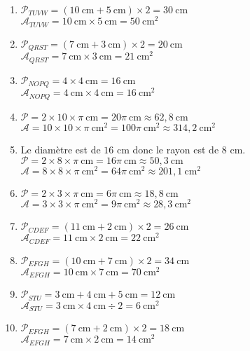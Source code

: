 \documentclass[a4paper,11pt,fleqn]{article}
\begin{document}
\begin{correction}
\begin{multicols}{2}
\begin{enumerate}
	\item $\mathcal{P}_{TUVW}=(10~\text{cm}+5~\text{cm})\times2=30~\text{cm}$\\
$\mathcal{A}_{TUVW}=10~\text{cm}\times5~\text{cm}=50~\text{cm}^2$
	\item $\mathcal{P}_{QRST}=(7~\text{cm}+3~\text{cm})\times2=20~\text{cm}$\\
$\mathcal{A}_{QRST}=7~\text{cm}\times3~\text{cm}=21~\text{cm}^2$
	\item $\mathcal{P}_{NOPQ}=4\times4~\text{cm}=16~\text{cm}$\\
$\mathcal{A}_{NOPQ}=4~\text{cm}\times4~\text{cm}=16~\text{cm}^2$
	\item $\mathcal{P}=2\times10\times\pi~\text{cm}=20\pi~\text{cm}\approx62,8~\text{cm}$\\
$\mathcal{A}=10\times10\times\pi~\text{cm}^2=100\pi~\text{cm}^2\approx314,2~\text{cm}^2$
	\item Le diamètre est de $16$ cm donc le rayon est de $8$ cm.\\
$\mathcal{P}=2\times8\times\pi~\text{cm}=16\pi~\text{cm}\approx50,3~\text{cm}$\\
$\mathcal{A}=8\times8\times\pi~\text{cm}^2=64\pi~\text{cm}^2\approx201,1~\text{cm}^2$
	\item $\mathcal{P}=2\times3\times\pi~\text{cm}=6\pi~\text{cm}\approx18,8~\text{cm}$\\
$\mathcal{A}=3\times3\times\pi~\text{cm}^2=9\pi~\text{cm}^2\approx28,3~\text{cm}^2$
	\item $\mathcal{P}_{CDEF}=(11~\text{cm}+2~\text{cm})\times2=26~\text{cm}$\\
$\mathcal{A}_{CDEF}=11~\text{cm}\times2~\text{cm}=22~\text{cm}^2$
	\item $\mathcal{P}_{EFGH}=(10~\text{cm}+7~\text{cm})\times2=34~\text{cm}$\\
$\mathcal{A}_{EFGH}=10~\text{cm}\times7~\text{cm}=70~\text{cm}^2$
	\item $\mathcal{P}_{STU}=3~\text{cm}+4~\text{cm}+5~\text{cm}=12~\text{cm}$\\
$\mathcal{A}_{STU}=3~\text{cm}\times4~\text{cm}\div2=6~\text{cm}^2$
	\item $\mathcal{P}_{EFGH}=(7~\text{cm}+2~\text{cm})\times2=18~\text{cm}$\\
$\mathcal{A}_{EFGH}=7~\text{cm}\times2~\text{cm}=14~\text{cm}^2$
\end{enumerate}
\end{multicols}


\end{correction}
\end{document}
